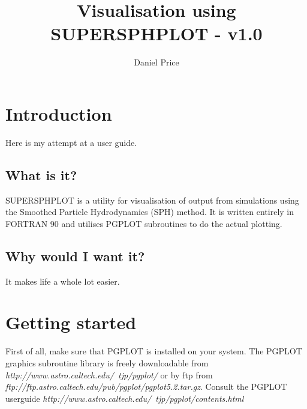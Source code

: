 \documentclass[a4paper,12pt]{article}
\title{Visualisation using SUPERSPHPLOT - v1.0}
\author{Daniel Price}
\begin{document}
\maketitle
\tableofcontents

\section{Introduction}
 Here is my attempt at a user guide.

\subsection{What is it?}
SUPERSPHPLOT is a utility for visualisation of output from simulations using the
Smoothed Particle Hydrodynamics (SPH) method. It is written entirely in FORTRAN
90 and utilises PGPLOT subroutines to do the actual plotting.

\subsection{Why would I want it?}
 It makes life a whole lot easier.

\section{Getting started}
 First of all, make sure that PGPLOT is installed on your system. The PGPLOT
 graphics subroutine library is
freely downloadable from \emph{http://www.astro.caltech.edu/~tjp/pgplot/} or by
ftp from \emph{ftp://ftp.astro.caltech.edu/pub/pgplot/pgplot5.2.tar.gz}. Consult
the PGPLOT userguide
\emph{http://www.astro.caltech.edu/~tjp/pgplot/contents.html} 
\end{document}

